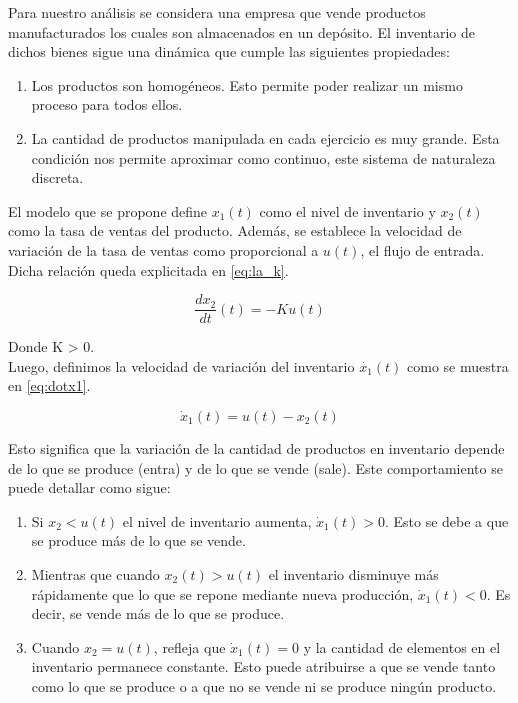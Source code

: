 \documentclass{sig-alternate}
\begin{document}
Para nuestro análisis se considera una empresa que vende productos manufacturados los cuales son almacenados en un depósito.
El inventario de dichos bienes sigue una dinámica que cumple las siguientes propiedades:
\begin{enumerate}
\item Los productos son homogéneos. Esto permite poder realizar un mismo proceso para todos ellos.
\item La cantidad de productos manipulada en cada ejercicio es muy grande. Esta condición nos permite aproximar como continuo, este sistema de
naturaleza discreta.
\end{enumerate}
El modelo que se propone define $x_{1}(t)$ como el nivel
de inventario y $x_{2}(t)$ como la tasa de ventas del producto. Además,
se establece la velocidad de variación de la tasa de ventas como proporcional a $u(t)$, el flujo de entrada. Dicha relación queda explicitada en
\eqref{eq:la_k}.

\begin{equation}
\frac{dx_{2}}{dt}(t)=-Ku(t)\label{eq:la_k}\end{equation}


Donde K > 0.\\
Luego, definimos la velocidad de variación del inventario $\dot{x_{1}}(t)$ como se muestra en \eqref{eq:dotx1}.

\begin{equation}
\dot{x}_{1}(t)=u(t)-x_{2}(t)\label{eq:dotx1}\end{equation}

Esto significa que la variación de la cantidad de productos en inventario depende de lo
que se produce (entra) y de lo que se vende (sale). Este comportamiento se puede detallar como sigue:
\begin{enumerate}
\item Si $x_{2}<u(t)$ el nivel de inventario aumenta, $\dot{x}_{1}(t)>0$.
Esto se debe a que se produce más de lo que se vende.
\item Mientras que cuando $x_{2}(t)>u(t)$ el inventario disminuye más rápidamente que lo que se repone mediante nueva producción, 
$\dot{x}_{1}(t)<0$. Es decir, se vende más de lo que se produce.
\item Cuando $x_{2}=u(t)$, refleja que $\dot{x}_{1}(t)=0$ y la cantidad de
elementos en el inventario permanece constante. Esto puede atribuirse
a que se vende tanto como lo que se produce o a que no se vende ni
se produce ningún producto.

\end{enumerate}
\end{document}

